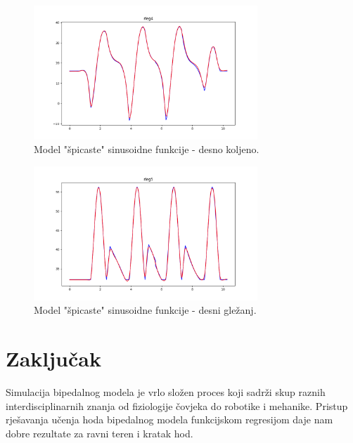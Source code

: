 \documentclass[times, utf8, zavrsni]{fer}
\begin{document}
\begin{figure}[htb!]
\centering
\includegraphics[width=0.75\textwidth]{rleg4.png}
\caption{Model "špicaste" sinusoidne funkcije - desno koljeno.}
\label{fig:rleg4}
\end{figure}

\begin{figure}[htb!]
\centering
\includegraphics[width=0.75\textwidth]{rleg5.png}
\caption{Model "špicaste" sinusoidne funkcije - desni gležanj.}
\label{fig:rleg5}
\end{figure}



\chapter{Zaključak}
Simulacija bipedalnog modela je vrlo složen proces koji sadrži skup raznih interdisciplinarnih znanja od fiziologije čovjeka do robotike i mehanike. Pristup rješavanja učenja hoda bipedalnog modela funkcijskom regresijom daje nam dobre rezultate za ravni teren i kratak hod.

\end{document}
